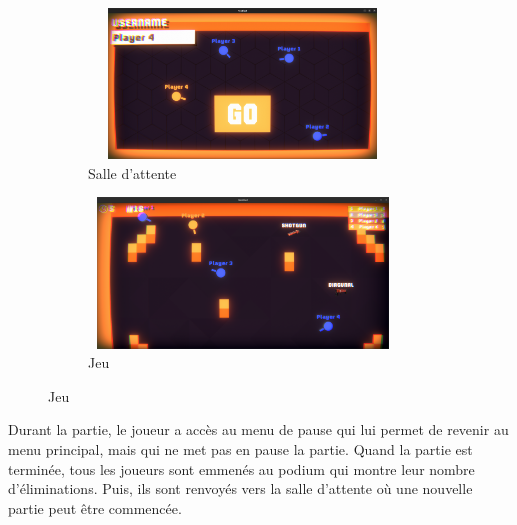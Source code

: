\documentclass[a4paper]{article}
\begin{document}
\begin{figure}[h]
    \begin{subfigure}{0.5\textwidth}
        \includegraphics[width=0.9\textwidth, height = 4cm]{images/game/waiting_room.png}
        \caption{Salle d'attente}
        \label{fig:waiting_room}
    \end{subfigure}
        \begin{subfigure}{0.5\textwidth}
        \includegraphics[width=0.9\textwidth, height = 4cm]{images/game/game.png}
        \caption{Jeu}
        \label{fig:jeu}
    \end{subfigure}
\end{figure}
\noindent Durant la partie, le joueur a accès au menu de pause qui lui permet de revenir au menu principal, mais qui ne met pas en pause la partie. Quand la partie est terminée, tous les joueurs sont emmenés au podium qui montre leur nombre d'éliminations. Puis, ils sont renvoyés vers la salle d'attente où une nouvelle partie peut être commencée.
\end{document}
